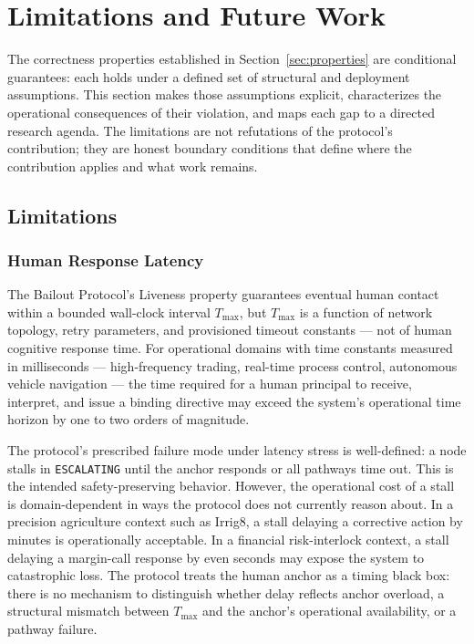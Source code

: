 \section{Limitations and Future Work}
\label{sec:limitations}

The correctness properties established in Section~\ref{sec:properties} are conditional guarantees: each holds under a defined set of structural and deployment assumptions. This section makes those assumptions explicit, characterizes the operational consequences of their violation, and maps each gap to a directed research agenda. The limitations are not refutations of the protocol's contribution; they are honest boundary conditions that define where the contribution applies and what work remains.

\subsection{Limitations}
\label{sec:limitations:subsection}

\subsubsection{Human Response Latency}
\label{sec:human-response-latency}

The Bailout Protocol's Liveness property guarantees eventual human contact within a bounded wall-clock interval $T_{\max}$, but $T_{\max}$ is a function of network topology, retry parameters, and provisioned timeout constants --- not of human cognitive response time. For operational domains with time constants measured in milliseconds --- high-frequency trading, real-time process control, autonomous vehicle navigation --- the time required for a human principal to receive, interpret, and issue a binding directive may exceed the system's operational time horizon by one to two orders of magnitude.

The protocol's prescribed failure mode under latency stress is well-defined: a node stalls in \texttt{ESCALATING} until the anchor responds or all pathways time out. This is the intended safety-preserving behavior. However, the operational cost of a stall is domain-dependent in ways the protocol does not currently reason about. In a precision agriculture context such as Irrig8, a stall delaying a corrective action by minutes is operationally acceptable. In a financial risk-interlock context, a stall delaying a margin-call response by even seconds may expose the system to catastrophic loss. The protocol treats the human anchor as a timing black box: there is no mechanism to distinguish whether delay reflects anchor overload, a structural mismatch between $T_{\max}$ and the anchor's operational availability, or a pathway failure.


